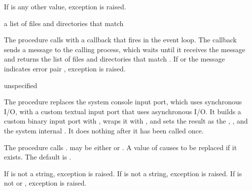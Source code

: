 If  is any other value, exception  is raised.

\begin{procedure}
\end{procedure}
\returns{} a list of files and directories that match 

The  procedure calls  with a
callback that fires in the event loop.  The callback sends a message
to the calling process, which waits until it receives the message and
returns the list of files and directories that match . If
 or the message indicates error pair
, exception
 is
raised.

\begin{procedure}
\end{procedure}
\returns{} unspecified

The  procedure replaces the system console
input port, which uses synchronous I/O, with a custom textual input
port that uses asynchronous I/O. It builds a custom binary input port
with , wraps it with ,
and sets the result as the ,
, and the system internal
. It does nothing after it has been
called once.

\begin{procedure}
\end{procedure}
\returns{} 

The  procedure calls
.  may be either  or
. A value of  causes
 to be replaced if it exists. The default is
.

If  is not a string, exception  is raised.  If  is
not a string, exception  is raised.  If  is not
 or , exception  is raised.

